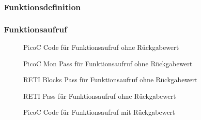 \subsubsection{Funktionsdefinition}
\subsubsection{Funktionsaufruf}
\begin{figure}[H]
  \centering
  \caption{PicoC Code für Funktionsaufruf ohne Rückgabewert}
  \label{fig:picoc_code_für_funktionsaufruf_ohne_rückgabewert}
\end{figure}

\begin{figure}[H]
  \centering
  \caption{PicoC Mon Pass für Funktionsaufruf ohne Rückgabewert}
  \label{fig:picoc_mon_pass_für_funktionsaufruf_ohne_rückgabewert}
\end{figure}

\begin{figure}[H]
  \centering
  \caption{RETI Blocks Pass für Funktionsaufruf ohne Rückgabewert}
  \label{fig:reti_blocks_pass_für_funktionsaufruf_ohne_rückgabewert}
\end{figure}

\begin{figure}[H]
  \centering
  \caption{RETI Pass für Funktionsaufruf ohne Rückgabewert}
  \label{fig:reti_pass_für_funktionsaufruf_ohne_rückgabewert}
\end{figure}


\begin{figure}[H]
  \centering
  \caption{PicoC Code für Funktionsaufruf mit Rückgabewert}
  \label{fig:picoc_code_für_funktionsaufruf_mit_rückgabewert}
\end{figure}

